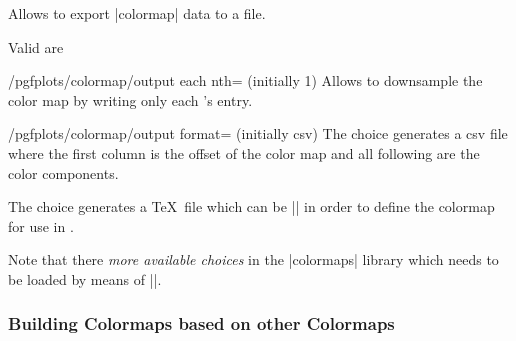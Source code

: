 \begin{command}{\pgfplotscolormaptodatafile{}}
	Allows to export |colormap| data to a file.
\begin{codeexample}[]
\end{codeexample}

\begin{codeexample}[]
\end{codeexample}
	
	Valid  are
	\begin{pgfplotskey}{/pgfplots/colormap/output each nth= (initially 1)}
		Allows to downsample the color map by writing only each 's entry.
	\end{pgfplotskey}
	\begin{pgfplotskey}{/pgfplots/colormap/output format= (initially csv)}
		The choice  generates a csv file where the first column is the offset of the color map and all following are the color components.

		The choice  generates a \TeX\ file which can be || in order to define the colormap for use in \PGFPlots.
	\end{pgfplotskey}
\end{command}


Note that there \emph{more available choices} in the |colormaps| library which needs to be loaded by means of ||.

\subsubsection{Building Colormaps based on other Colormaps}
\label{sec:pgfplots:colormaps:based:on:others}

